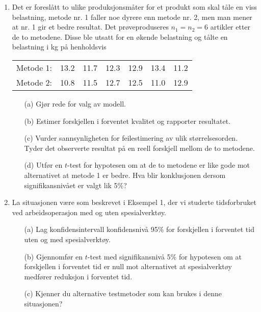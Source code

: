 \begin{enumerate}
\item Det er foreslått to ulike produksjonsmåter for et
produkt som skal tåle en viss belastning, metode nr. 1 faller noe
dyrere enn metode nr. 2, men man mener at nr. 1 gir et bedre resultat.
Det prøveproduseres $n_1 = n_2 = 6$ artikler etter de to metodene.
Disse ble utsatt for en økende belastning og tålte en belastning
i kg på henholdsvis
\begin{center}
\begin{tabular}{lcccccc}
Metode 1:  &   13.2  &  11.7  &  12.3  &  12.9  &  13.4  &  11.2 \\
Metode 2:  &   10.8  &  11.5  &  12.7  &  12.5  &  11.0  &  12.9
\end{tabular}
\end{center}
\begin{itemize}
\item[(a)] Gjør rede for valg av modell.
\item[(b)] Estimer forskjellen i forventet kvalitet og rapporter 
           resultatet.
\item[(c)] Vurder sannsynligheten for feilestimering av ulik 
           størrelsesorden.  Tyder det observerte resultat på en
           reell forskjell mellom de to metodene.
\item[(d)]  Utfør en $t$-test for hypotesen om at de to metodene er 
           like gode mot alternativet at metode 1 er bedre.  Hva blir
           konklusjonen dersom signifikansnivået er valgt lik 5\%?
\end{itemize}

\item 
La situasjonen være som beskrevet i Eksempel 1, der vi studerte 
tidsforbruket ved arbeidsoperasjon med og uten spesialverktøy.
\begin{itemize}
\item[(a)] Lag konfidensintervall konfidensnivå 95\% for forskjellen
           i forventet tid uten og med spesialverktøy.
\item[(b)] Gjennomfør en $t$-test med signifikansnivå 5\%  for
        hypotesen om at forskjellen i forventet tid er null mot alternativet
          at spesialverktøy medfører reduksjon i forventet tid.
\item[(c)] Kjenner du alternative testmetoder som kan brukes i denne
           situasjonen?
\end{itemize}


\end{enumerate}
